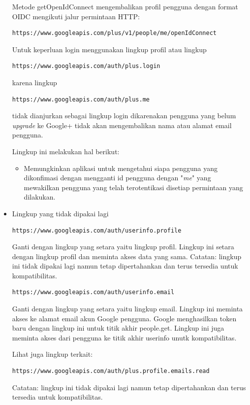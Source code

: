\begin{itemize}
Metode getOpenIdConnect mengembalikan profil pengguna dengan format OIDC
mengikuti jalur permintaan HTTP:
\begin{lstlisting}[basicstyle=\footnotesize]
https://www.googleapis.com/plus/v1/people/me/openIdConnect
\end{lstlisting}

Untuk keperluan login menggunakan lingkup profil atau lingkup
\begin{lstlisting}[basicstyle=\footnotesize]
https://www.googleapis.com/auth/plus.login
\end{lstlisting}
karena lingkup
\begin{lstlisting}[basicstyle=\footnotesize]
https://www.googleapis.com/auth/plus.me
\end{lstlisting}
tidak dianjurkan sebagai lingkup login dikarenakan pengguna yang belum
{\it upgrade} ke Google+ tidak akan mengembalikan nama atau alamat email
pengguna.

Lingkup ini melakukan hal berikut:
\begin{itemize}
\item
Memungkinkan aplikasi untuk mengetahui siapa pengguna yang dikonfimasi dengan
mengganti id pengguna dengan "{\it me}" yang mewakilkan pengguna yang telah
terotentikasi disetiap permintaan yang dilakukan.
\end{itemize}

\item Lingkup yang tidak dipakai lagi\\
\begin{lstlisting}[basicstyle=\footnotesize]
https://www.googleapis.com/auth/userinfo.profile
\end{lstlisting}

Ganti dengan lingkup yang setara yaitu lingkup profil. Lingkup ini setara
dengan lingkup profil dan meminta akses data yang sama. Catatan: lingkup ini
tidak dipakai lagi namun tetap dipertahankan dan terus tersedia untuk
kompatibilitas.

\begin{lstlisting}[basicstyle=\footnotesize]
https://www.googleapis.com/auth/userinfo.email
\end{lstlisting}

Ganti dengan lingkup yang setara yaitu lingkup email. Lingkup ini meminta akses
ke alamat email akun Google pengguna. Google menghasilkan token baru dengan
lingkup ini untuk titik akhir people.get. Lingkup ini juga meminta akses dari
pengguna ke titik akhir userinfo unutk kompatibilitas.

Lihat juga lingkup terkait:
\begin{lstlisting}[basicstyle=\footnotesize]
https://www.googleapis.com/auth/plus.profile.emails.read
\end{lstlisting}
Catatan: lingkup ini tidak dipakai lagi namun tetap dipertahankan dan terus
tersedia untuk kompatibilitas.
\end{itemize}

